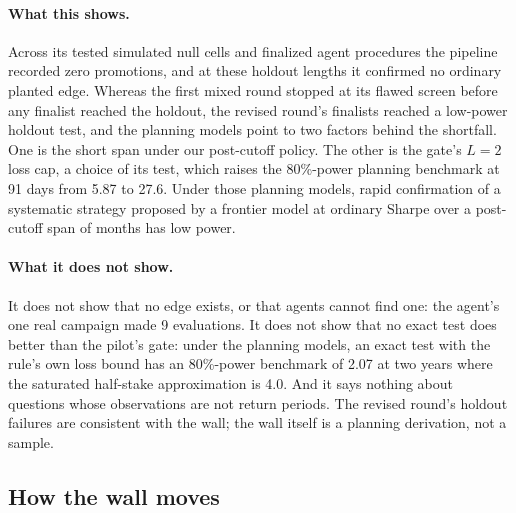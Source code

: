 \documentclass[11pt]{article}
\begin{document}
\paragraph{What this shows.} Across its tested simulated null cells and finalized agent procedures the pipeline recorded zero promotions, and at these holdout lengths it confirmed no ordinary planted edge. Whereas the first mixed round stopped at its flawed screen before any finalist reached the holdout, the revised round's finalists reached a low-power holdout test, and the planning models point to two factors behind the shortfall. One is the short span under our post-cutoff policy. The other is the gate's $L=2$ loss cap, a choice of its test, which raises the 80\%-power planning benchmark at 91 days from 5.87 to 27.6. Under those planning models, rapid confirmation of a systematic strategy proposed by a frontier model at ordinary Sharpe over a post-cutoff span of months has low power.

\paragraph{What it does not show.} It does not show that no edge exists, or that agents cannot find one: the agent's one real campaign made 9 evaluations. It does not show that no exact test does better than the pilot's gate: under the planning models, an exact test with the rule's own loss bound has an 80\%-power benchmark of 2.07 at two years where the saturated half-stake approximation is 4.0. And it says nothing about questions whose observations are not return periods. The revised round's holdout failures are consistent with the wall; the wall itself is a planning derivation, not a sample.

\subsection{How the wall moves}\label{sec:moves}
\end{document}
